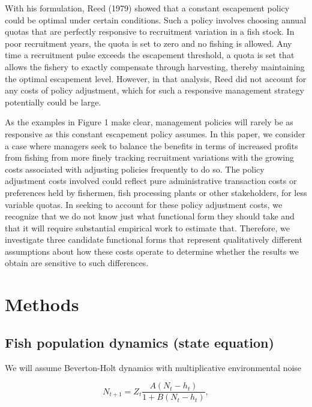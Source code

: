 \documentclass[review,12pt,author-year,titlepage]{components/elsarticle} %
\begin{document}
\begin{flushleft}
With his formulation, Reed (1979) showed that a constant escapement
policy could be optimal under certain conditions. Such a policy involves
choosing annual quotas that are perfectly responsive to recruitment
variation in a fish stock. In poor recruitment years, the quota is set
to zero and no fishing is allowed. Any time a recruitment pulse exceeds
the escapement threshold, a quota is set that allows the fishery to
exactly compensate through harvesting, thereby maintaining the optimal
escapement level. However, in that analysis, Reed did not account for
any costs of policy adjustment, which for such a responsive management
strategy potentially could be large.

As the examples in Figure 1 make clear, management policies will rarely
be as responsive as this constant escapement policy assumes. In this
paper, we consider a case where managers seek to balance the benefits in
terms of increased profits from fishing from more finely tracking
recruitment variations with the growing costs associated with adjusting
policies frequently to do so. The policy adjustment costs involved could
reflect pure administrative transaction costs or preferences held by
fishermen, fish processing plants or other stakeholders, for less
variable quotas. In seeking to account for these policy adjustment
costs, we recognize that we do not know just what functional form they
should take and that it will require substantial empirical work to
estimate that. Therefore, we investigate three candidate functional
forms that represent qualitatively different assumptions about how these
costs operate to determine whether the results we obtain are sensitive
to such differences.

\section{Methods}\label{methods}

\subsection{Fish population dynamics (state
equation)}\label{fish-population-dynamics-state-equation}

We will assume Beverton-Holt dynamics with multiplicative environmental
noise

\begin{equation}
N_{t+1} = Z_t \frac{A (N_t - h_t)}{1 + B (N_t - h_t)}, \label{eq:state_equation}
\end{equation}


\end{flushleft}
\end{document}
